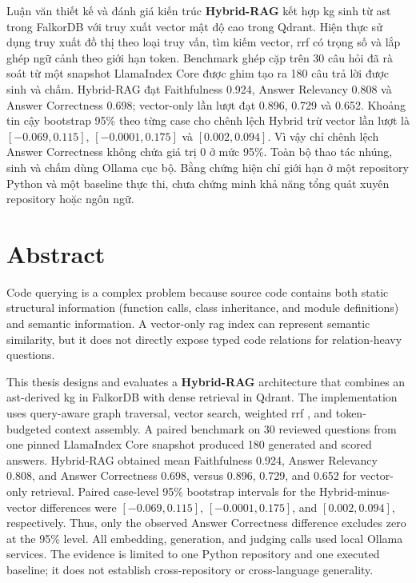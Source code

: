 \documentclass[12pt,a4paper,oneside]{report}
\begin{document}
Luận văn thiết kế và đánh giá kiến trúc \textbf{Hybrid-RAG} kết hợp \gls{kg} sinh từ \gls{ast} trong FalkorDB với truy xuất vector mật độ cao trong Qdrant. Hiện thực sử dụng truy xuất đồ thị theo loại truy vấn, tìm kiếm vector, \gls{rrf} có trọng số \cite{cormack2009rrf} và lắp ghép ngữ cảnh theo giới hạn token. Benchmark ghép cặp trên 30 câu hỏi đã rà soát từ một snapshot LlamaIndex Core được ghim tạo ra 180 câu trả lời được sinh và chấm. Hybrid-RAG đạt Faithfulness 0.924, Answer Relevancy 0.808 và Answer Correctness 0.698; vector-only lần lượt đạt 0.896, 0.729 và 0.652. Khoảng tin cậy bootstrap 95\% theo từng case cho chênh lệch Hybrid trừ vector lần lượt là $[-0.069, 0.115]$, $[-0.0001, 0.175]$ và $[0.002, 0.094]$. Vì vậy chỉ chênh lệch Answer Correctness không chứa giá trị 0 ở mức 95\%. Toàn bộ thao tác nhúng, sinh và chấm dùng Ollama cục bộ. Bằng chứng hiện chỉ giới hạn ở một repository Python và một baseline thực thi, chưa chứng minh khả năng tổng quát xuyên repository hoặc ngôn ngữ.

\chapter*{Abstract}
Code querying is a complex problem because source code contains both static structural information (function calls, class inheritance, and module definitions) and semantic information. A vector-only \gls{rag} index can represent semantic similarity, but it does not directly expose typed code relations for relation-heavy questions.

This thesis designs and evaluates a \textbf{Hybrid-RAG} architecture that combines an \gls{ast}-derived \gls{kg} in FalkorDB with dense retrieval in Qdrant. The implementation uses query-aware graph traversal, vector search, weighted \gls{rrf} \cite{cormack2009rrf}, and token-budgeted context assembly. A paired benchmark on 30 reviewed questions from one pinned LlamaIndex Core snapshot produced 180 generated and scored answers. Hybrid-RAG obtained mean Faithfulness 0.924, Answer Relevancy 0.808, and Answer Correctness 0.698, versus 0.896, 0.729, and 0.652 for vector-only retrieval. Paired case-level 95\% bootstrap intervals for the Hybrid-minus-vector differences were $[-0.069, 0.115]$, $[-0.0001, 0.175]$, and $[0.002, 0.094]$, respectively. Thus, only the observed Answer Correctness difference excludes zero at the 95\% level. All embedding, generation, and judging calls used local Ollama services. The evidence is limited to one Python repository and one executed baseline; it does not establish cross-repository or cross-language generality.
\end{document}
